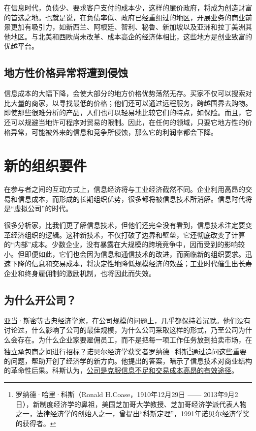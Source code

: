 在信息时代，负债少、要求客户支付的成本少，这样的廉价政府，将成为创造财富的首选之地。也就是说，在负债率低、政府已经重组过的地区，开展业务的商业前景更加有吸引力，如新西兰、阿根廷、智利、秘鲁、新加坡以及亚洲和拉丁美洲其他地区。与北美和西欧尚未改革、成本高企的经济体相比，这些地方是创业致富的优越平台。

\subsection{地方性价格异常将遭到侵蚀}
信息成本的大幅下降，会使大部分的地方价格优势荡然无存。买家不仅可以搜索对比大量的商家，以寻找最低的价格；他们还可以通过远程服务，跨越国界去购物。即使那些很难分析的产品，人们也可以轻易地比较它们的特点，如保险。而且，它还可以规避当地许可程序对贸易的限制。因此，在任何的领域，只要它地方性的价格异常，可能被外来的信息和竞争所侵蚀，那么它的利润率都会下降。

\section{新的组织要件}
在参与者之间的互动方式上，信息经济将与工业经济截然不同。企业利用高昂的交易和信息成本，而形成的长期组织优势，很多都将被信息技术所消解。信息时代将是“虚拟公司”的时代。

很多分析家，比我们更了解信息技术，但他们还完全没有看到，信息技术注定要变革经济组织的逻辑。这种新技术，不仅打破了边界和壁垒，它还彻底改变了计算的“内部”成本。少数企业，没有暴露在大规模的跨境竞争中，因而受到的影响较小。但即便如此，它们也会因为信息和通信技术的改进，而面临新的组织要求。迅速下降的信息和交易成本，将决定性地降低规模经济的效益；工业时代催生出长寿企业和终身雇佣制的激励机制，也将因此而失效。

\subsection{为什么开公司？}
亚当·斯密等古典经济学家，在公司规模的问题上，几乎都保持着沉默。他们没有讨论过，什么影响了公司的最佳规模，为什么公司采取这样的形式，乃至公司为什么会存在。为什么企业家要雇佣员工，而不是把每一项工作任务放到拍卖市场，在独立承包商之间进行招标？诺贝尔经济学获奖者罗纳德·科斯\footnote{罗纳德·哈里·科斯（Ronald H.Coase，1910年12月29日 —— 2013年9月2日），新制度经济学的鼻祖，美国芝加哥大学教授、芝加哥经济学派代表人物之一，法律经济学的创始人之一，曾提出“科斯定理”，1991年诺贝尔经济学奖的获得者。}通过追问这些重要的问题，帮助开创了经济学的新方向。他提出的答案，暗示了信息技术对商业结构的革命性后果。科斯认为，\uline{公司是克服信息不足和交易成本高昂的有效途径}。

